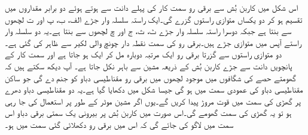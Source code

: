 اس شکل میں کاربن بُش سے برقی رو سمت کار کی پہلے دانت سے ہوتے ہوئے دو برابر مقداروں میں تقسیم ہو کر دو یکساں متوازی راستوں گزرے گی۔ایک راستہ سلسلہ وار جڑے الف، ب، پ اور ت لچھوں سے بنتا ہے جبکہ دوسرا راستہ سلسلہ وار جڑے ٹ، ث، ج اور چ لچھوں سے بنتا ہے۔یہ دو سلسلہ وار راستے آپس میں متوازی جڑے ہیں۔برقی رو کی سمت نقطہ دار چونچ والی لکیر سے ظاہر کی گئی ہے۔دو متوازی راستوں سے گزرتا برقی رو ایک مرتبہ دوبارہ مل کر ایک ہو جاتا ہے اور سمت کار کے پانچویں دانت سے جڑے کاربن بُش کے ذریعہ مشین سے باہر نکل جاتا ہے۔ آپ دیکھ سکتے ہیں کہ گھومتے حصے کی شگافوں میں موجود لچھوں میں برقی رو مقناطیسی دباو کو جنم دے گی جو ساکن مقناطیسی دباو کی عمودی سمت میں ہو گی جیسا شکل   میں دکھایا گیا ہے۔یہ دو مقناطیسی دباو دھرے پر گھڑی کی سمت میں قوت مروڑ پیدا کریں گے۔یوں اگر مشین موٹر کے طور پر استعمال کی جا رہی ہو تو یہ گھڑی کی سمت گھومے گی۔اس صورت میں کاربن بُش پر بیرونی یک سمتی برقی دباو اس سمت میں لاگو کی جائے گی کہ اس میں برقی رو دکھلائی گئی سمت میں ہو۔
